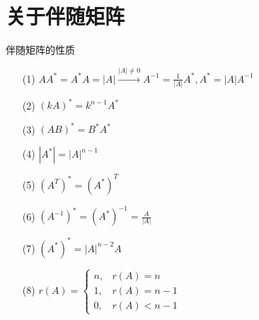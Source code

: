 \documentclass[12pt, a4paper, oneside, UTF8]{ctexbook}
\begin{document}
\section{关于伴随矩阵}
\begin{remark}
    伴随矩阵的性质
    \begin{enumerate}
    \item[(1)] $AA^*=A^*A=\left|A\right|\xrightarrow{|A|\neq 0}A^{-1}=\frac{1}{|A|}A^*,A^*=|A|A^{-1}$
    \item[(2)] $(kA)^*=k^{n-1}A^*$
    \item[(3)] $(AB)^*=B^*A^*$
    \item[(4)] $|A^*|=\left|A\right|^{n-1}$
    \item[(5)] $(A^T)^*=(A^*)^T$
    \item[(6)] $(A^{-1})^*=(A^*)^{-1}=\frac{A}{\left|A\right|}$
    \item[(7)] $(A^*)^*=\left|A\right|^{n-2}A$
    \item[(8)] 
    $r(A)=
    \begin{cases}
        n,& r(A)=n\\
        1,& r(A)=n-1\\
        0,& r(A)<n-1
    \end{cases}
    $
    \end{enumerate}       
\end{remark}
\end{document}
